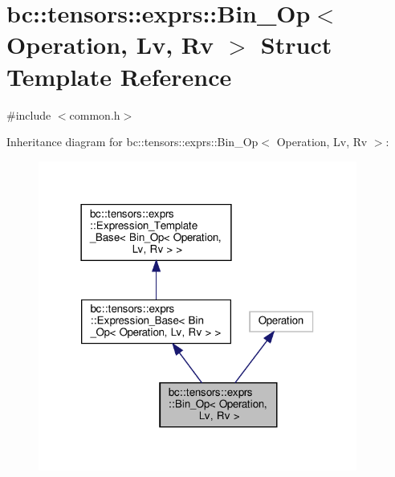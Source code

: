 \hypertarget{structbc_1_1tensors_1_1exprs_1_1Bin__Op}{}\section{bc\+:\+:tensors\+:\+:exprs\+:\+:Bin\+\_\+\+Op$<$ Operation, Lv, Rv $>$ Struct Template Reference}
\label{structbc_1_1tensors_1_1exprs_1_1Bin__Op}


{\ttfamily \#include $<$common.\+h$>$}



Inheritance diagram for bc\+:\+:tensors\+:\+:exprs\+:\+:Bin\+\_\+\+Op$<$ Operation, Lv, Rv $>$\+:\nopagebreak
\begin{figure}[H]
\begin{center}
\leavevmode
\includegraphics[width=297pt]{structbc_1_1tensors_1_1exprs_1_1Bin__Op__inherit__graph}
\end{center}
\end{figure}


